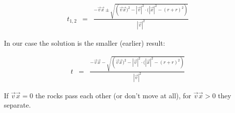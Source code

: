 \begin{eqnarray}
t_{1,2} &=& \frac{ 
       	-\vec{v}\vec{x} \pm \sqrt{ \left(\vec{v}\vec{x})^2 - 
	|\vec{v}|^2\cdot(|\vec{x}|^2 - (r+r)^2\right) }
    }{ 
	|\vec{v}|^2 
    }
\end{eqnarray}

In our case the solution is the smaller (earlier) result:

\begin{eqnarray}
t &=& \frac{ 
       	-\vec{v}\vec{x} - \sqrt{ \left(\vec{v}\vec{x})^2 - 
	|\vec{v}|^2\cdot(|\vec{x}|^2 - (r+r)^2\right) }
    }{ 
	|\vec{v}|^2 
    }
\end{eqnarray}

If $\vec{v}\vec{x} = 0$ the rocks pass each other (or don't move at all), for
$\vec{v}\vec{x} > 0$ they separate.

\fi

